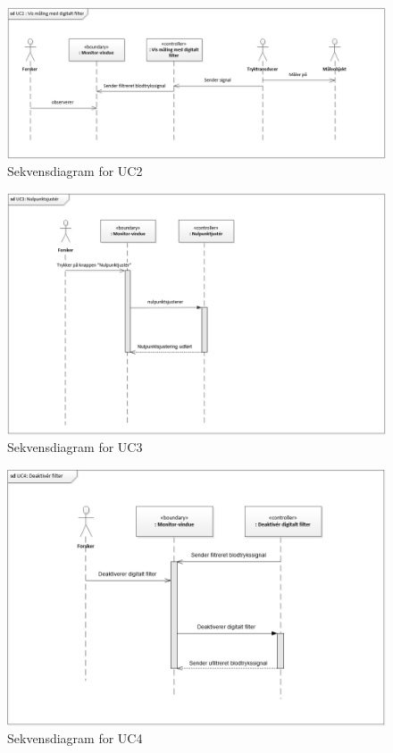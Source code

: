 \begin{figure}[H]
	\centering
	\includegraphics[width=1\textwidth]{Figurer/UC2_SD}
	\caption{Sekvensdiagram for UC2}
\end{figure}

\begin{figure}[H]
	\centering
	\includegraphics[width=1\textwidth]{Figurer/UC3_SD}
	\caption{Sekvensdiagram for UC3}
\end{figure}

\begin{figure}[H]
	\centering
	\includegraphics[width=1\textwidth]{Figurer/UC4_SD}
	\caption{Sekvensdiagram for UC4}
\end{figure}

